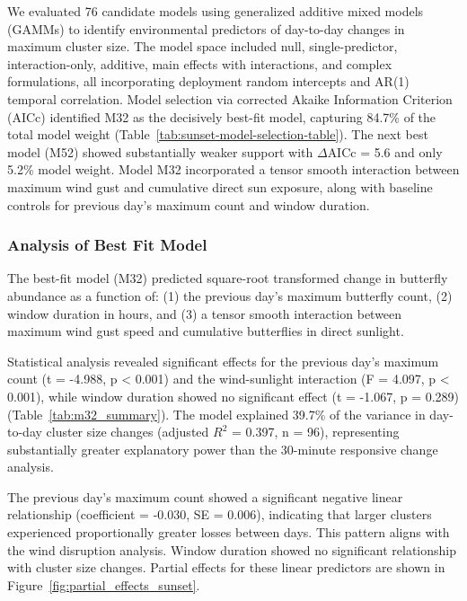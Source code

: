 We evaluated 76 candidate models using generalized additive mixed models (GAMMs) to identify environmental predictors of day-to-day changes in maximum cluster size. The model space included null, single-predictor, interaction-only, additive, main effects with interactions, and complex formulations, all incorporating deployment random intercepts and AR(1) temporal correlation. Model selection via corrected Akaike Information Criterion (AICc) identified M32 as the decisively best-fit model, capturing 84.7\% of the total model weight (Table~\ref{tab:sunset-model-selection-table}). The next best model (M52) showed substantially weaker support with $\Delta$AICc = 5.6 and only 5.2\% model weight. Model M32 incorporated a tensor smooth interaction between maximum wind gust and cumulative direct sun exposure, along with baseline controls for previous day's maximum count and window duration.



\subsubsection{Analysis of Best Fit Model}

The best-fit model (M32) predicted square-root transformed change in butterfly abundance as a function of: (1) the previous day's maximum butterfly count, (2) window duration in hours, and (3) a tensor smooth interaction between maximum wind gust speed and cumulative butterflies in direct sunlight.

Statistical analysis revealed significant effects for the previous day's maximum count (t = -4.988, p < 0.001) and the wind-sunlight interaction (F = 4.097, p < 0.001), while window duration showed no significant effect (t = -1.067, p = 0.289) (Table~\ref{tab:m32_summary}). The model explained 39.7\% of the variance in day-to-day cluster size changes (adjusted $R^2$ = 0.397, n = 96), representing substantially greater explanatory power than the 30-minute responsive change analysis.



The previous day's maximum count showed a significant negative linear relationship (coefficient = -0.030, SE = 0.006), indicating that larger clusters experienced proportionally greater losses between days. This pattern aligns with the wind disruption analysis. Window duration showed no significant relationship with cluster size changes. Partial effects for these linear predictors are shown in Figure~\ref{fig:partial_effects_sunset}.

